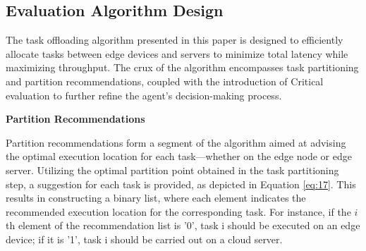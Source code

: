 \documentclass[preprint,12pt]{elsarticle}
\begin{document}
\subsection{Evaluation Algorithm Design}

The task offloading algorithm presented in this paper is designed to efficiently allocate tasks between edge devices and servers to minimize total latency while maximizing throughput. The crux of the algorithm encompasses task partitioning and partition recommendations, coupled with the introduction of Critical evaluation to further refine the agent's decision-making process.

\textbf{Partition Recommendations}

Partition recommendations form a segment of the algorithm aimed at advising the optimal execution location for each task—whether on the edge node or edge server. Utilizing the optimal partition point obtained in the task partitioning step, a suggestion for each task is provided, as depicted in Equation \ref{eq:17}. This results in constructing a binary list, where each element indicates the recommended execution location for the corresponding task. For instance, if the \(i\)th element of the recommendation list is '0', task i should be executed on an edge device; if it is '1', task i should be carried out on a cloud server.



\end{document}
